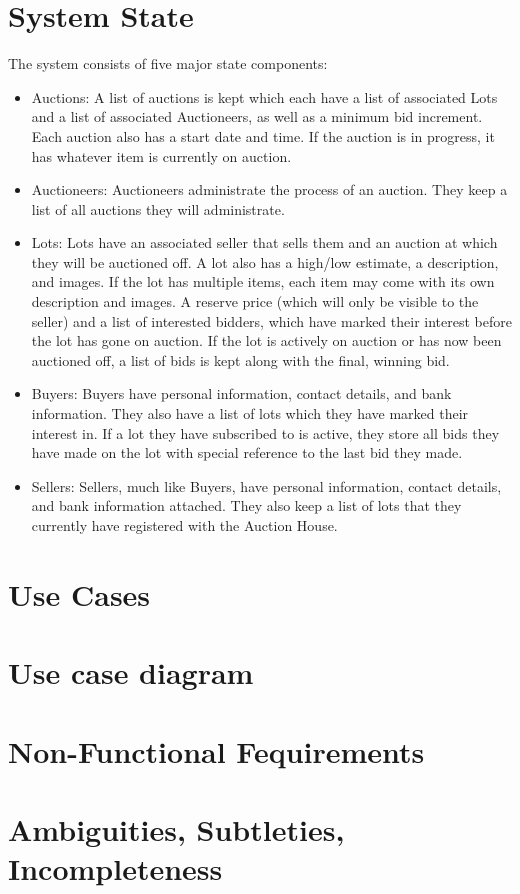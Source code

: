 \documentclass[titlepage]{article}
\begin{document}
\section{System State}
The system consists of five major state components:
\begin{itemize}
\item Auctions: A list of auctions is kept which each have a list of associated Lots and a list of associated Auctioneers, as well as a minimum bid increment. Each auction also has a start date and time. If the auction is in progress, it has whatever item is currently on auction.
\item Auctioneers: Auctioneers administrate the process of an auction. They keep a list of all auctions they will administrate.
\item Lots: Lots have an associated seller that sells them and an auction at which they will be auctioned off. A lot also has a high/low estimate, a description, and images. If the lot has multiple items, each item may come with its own description and images. A reserve price (which will only be visible to the seller) and a list of interested bidders, which have marked their interest before the lot has gone on auction. If the lot is actively on auction or has now been auctioned off, a list of bids is kept along with the final, winning bid.
\item Buyers: Buyers have personal information, contact details, and bank information. They also have a list of lots which they have marked their interest in. If a lot they have subscribed to is active, they store all bids they have made on the lot with special reference to the last bid they made.
\item Sellers: Sellers, much like Buyers, have personal information, contact details, and bank information attached. They also keep a list of lots that they currently have registered with the Auction House.
\end{itemize}
\section{Use Cases}

\section{Use case diagram}

\section{Non-Functional Fequirements}

\section{Ambiguities, Subtleties, Incompleteness}
\end{document}
